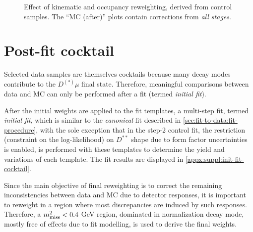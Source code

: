\begin{figure}[htb]
    \caption{
        Effect of \B kinematic and occupancy reweighting,
        derived from \jpsi\kaon control samples.
        The ``MC (after)'' plots contain corrections from \emph{all stages}.
    }
    \label{fig:rwt-JpsiK}
\end{figure}


\section{Post-fit cocktail}
\label{sec:data-mc:postfit-cocktail}

Selected data samples are themselves cocktails because many
decay modes contribute to the $D^{(*)}\mu$ final state.
Therefore, meaningful comparisons between data and MC can only be performed
after a fit (termed \emph{initial fit}).

After the initial weights are applied to the fit templates,
a multi-step fit,
termed \emph{initial fit},
which is similar to the \emph{canonical} fit described in
\cref{sec:fit-to-data:fit-procedure},
with the sole exception that in the step-2 control fit,
the restriction (constraint on the log-likelihood)
on $D^{**}$ shape due to form factor uncertainties is enabled,
is performed with these templates to determine the yield and variations of
each template.
The fit results are displayed in
\cref{appx:suppl:init-fit-cocktail}.

Since the main objective of final reweighting is to correct the remaining
inconsistencies between data and MC due to detector responses,
it is important to reweight in a region where most discrepancies are induced by
such responses.
Therefore, a $m^2_\text{miss} < 0.4$ GeV region,
dominated in normalization decay mode,
mostly free of effects due to fit modelling,
is used to derive the final weights.

